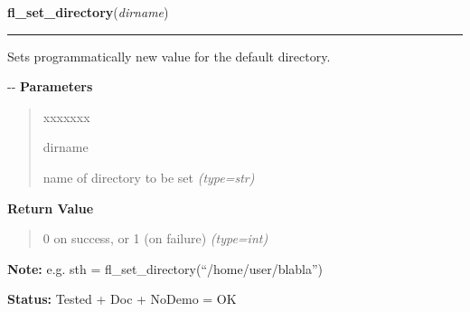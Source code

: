 \hspace{.8\funcindent}\begin{boxedminipage}{\funcwidth}

    \raggedright \textbf{fl\_set\_directory}(\textit{dirname})

    \vspace{-1.5ex}

    \rule{\textwidth}{0.5\fboxrule}
\setlength{\parskip}{2ex}

Sets programmatically new value for the default directory.

-{}-
\setlength{\parskip}{1ex}
      \textbf{Parameters}
      \vspace{-1ex}

      \begin{quote}
        \begin{Ventry}{xxxxxxx}

          \item[dirname]


name of directory to be set
            {\it (type=str)}

        \end{Ventry}

      \end{quote}

      \textbf{Return Value}
    \vspace{-1ex}

      \begin{quote}

0 on success, or 1 (on failure)
      {\it (type=int)}

      \end{quote}

\textbf{Note:} 
e.g. sth = fl\_set\_directory(``/home/user/blabla'')


\textbf{Status:} 
Tested + Doc + NoDemo = OK


    \end{boxedminipage}

    \label{xformslib:flgoodies:fl_set_pattern}

    \vspace{0.5ex}

